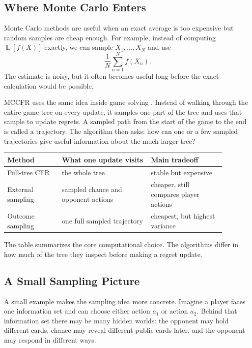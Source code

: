 \documentclass[11pt,reqno,twoside]{article}
\theoremstyle{myThm}
\theoremstyle{myRem}
\theoremstyle{myDef}
\newcommand{\Expect}{\operatorname{\mathbb{E}}}
\numberwithin{equation}{section}
\begin{document}
\subsection{Where Monte Carlo Enters}

Monte Carlo methods are useful when an exact average is too expensive but
random samples are cheap enough. For example, instead of computing
$\Expect[f(X)]$ exactly, we can sample $X_1,\ldots,X_N$ and use
\[
\frac{1}{N}\sum_{n=1}^N f(X_n).
\]
The estimate is noisy, but it often becomes useful long before the exact
calculation would be possible.

MCCFR uses the same idea inside game solving \cite{lanctot2009}. Instead
of walking through the entire game tree on every update, it samples one
part of the tree and uses that sample to update regrets. A sampled path
from the start of the game to the end is called a trajectory. The
algorithm then asks: how can one or a few sampled trajectories give useful
information about the much larger tree?

\begin{center}
\small
\begin{tabular}{p{0.22\linewidth}p{0.36\linewidth}p{0.30\linewidth}}
\toprule
Method & What one update visits & Main tradeoff \\
\midrule
Full-tree CFR & the whole tree & stable but expensive \\
External sampling & sampled chance and opponent actions & cheaper, still compares player actions \\
Outcome sampling & one full sampled trajectory & cheapest, but highest variance \\
\bottomrule
\end{tabular}
\end{center}

The table summarizes the core computational choice. The algorithms differ
in how much of the tree they inspect before making a regret update.

\subsection{A Small Sampling Picture}

A small example makes the sampling idea more concrete. Imagine a player
faces one information set and can choose either action $a_1$ or action $a_2$.
Behind that information set there may be many hidden worlds: the opponent
may hold different cards, chance may reveal different public cards later,
and the opponent may respond in different ways.
\end{document}
